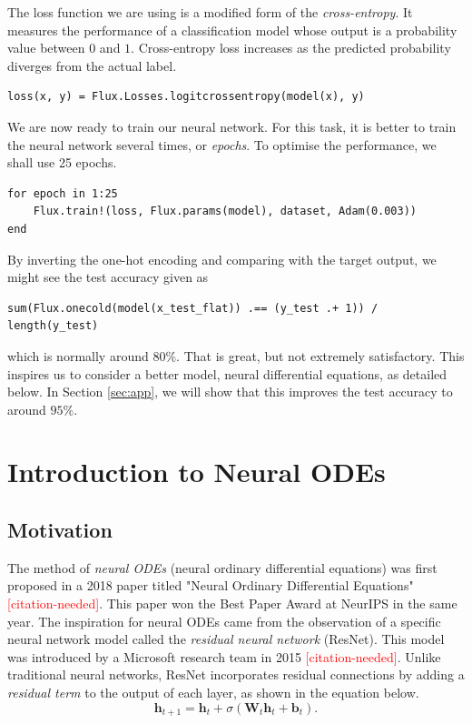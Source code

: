 \documentclass[a4paper,11pt,titlepage]{article}
\newcommand{\citationneeded}{\textcolor{red}{[citation-needed]}}
\theoremstyle{definition}
\theoremstyle{plain}
\theoremstyle{remark}
\begin{document}
The loss function we are using is a modified form of the \textit{cross-entropy}. It measures the performance of a classification model whose output is a probability value between $0$ and $1$. Cross-entropy loss increases as the predicted probability diverges from the actual label.

\begin{verbatim}
loss(x, y) = Flux.Losses.logitcrossentropy(model(x), y)
\end{verbatim}

We are now ready to train our neural network. For this task, it is better to train the neural network several times, or \textit{epochs}. To optimise the performance, we shall use 25 epochs.

\begin{verbatim}
for epoch in 1:25
    Flux.train!(loss, Flux.params(model), dataset, Adam(0.003))
end
\end{verbatim}

By inverting the one-hot encoding and comparing with the target output, we might see the test accuracy given as

\begin{verbatim}
sum(Flux.onecold(model(x_test_flat)) .== (y_test .+ 1)) / length(y_test)
\end{verbatim}

which is normally around $80\%$. That is great, but not extremely satisfactory. This inspires us to consider a better model, neural differential equations, as detailed below. In Section \ref{sec:app}, we will show that this improves the test accuracy to around $95\%$.

\pagebreak
\section{Introduction to Neural ODEs}

\subsection{Motivation}

The method of \textit{neural ODEs} (neural ordinary differential equations) was first proposed in a 2018 paper titled "Neural Ordinary Differential Equations" \citationneeded. This paper won the Best Paper Award at NeurIPS in the same year. The inspiration for neural ODEs came from the observation of a specific neural network model called the \textit{residual neural network} (ResNet). This model was introduced by a Microsoft research team in 2015 \citationneeded. Unlike traditional neural networks, ResNet incorporates residual connections by adding a \textit{residual term} to the output of each layer, as shown in the equation below.
\begin{equation}\label{eq1}
    \textbf{h}_{t+1} = \textbf{h}_t + \sigma\left(\textbf{W}_t\textbf{h}_t + \textbf{b}_t\right).\tag{1}
\end{equation}
\end{document}
